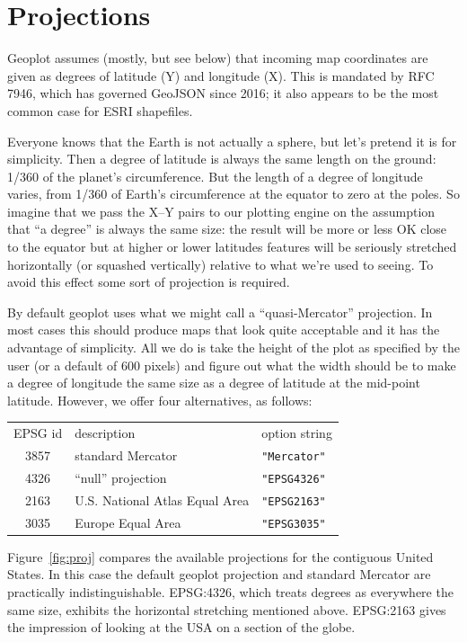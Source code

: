 \documentclass{article}
\newcommand{\myappendix}[1]{%
\addtocounter{appcount}{1}
\section{#1}}
\begin{document}
\clearpage
\myappendix{Projections}
\label{app:proj}

\textsf{Geoplot} assumes (mostly, but see below) that incoming map
coordinates are given as degrees of latitude (Y) and longitude
(X). This is mandated by RFC 7946, which has governed GeoJSON since
2016; it also appears to be the most common case for ESRI shapefiles.

Everyone knows that the Earth is not actually a sphere, but let's
pretend it is for simplicity. Then a degree of latitude is always the
same length on the ground: 1/360 of the planet's circumference. But
the length of a degree of longitude varies, from 1/360 of Earth's
circumference at the equator to zero at the poles. So imagine that we
pass the X--Y pairs to our plotting engine on the assumption that ``a
degree'' is always the same size: the result will be more or less OK
close to the equator but at higher or lower latitudes features will be
seriously stretched horizontally (or squashed vertically) relative to
what we're used to seeing. To avoid this effect some sort of
projection is required.

By default geoplot uses what we might call a ``quasi-Mercator''
projection. In most cases this should produce maps that look quite
acceptable and it has the advantage of simplicity. All we do is take
the height of the plot as specified by the user (or a default of 600
pixels) and figure out what the width should be to make a degree of
longitude the same size as a degree of latitude at the mid-point
latitude. However, we offer four alternatives, as follows:
\begin{center}
  \begin{tabular}{cll}
    EPSG id & description & option string \\[4pt]
  \textsf{3857} & standard Mercator & \verb|"Mercator"| \\
  \textsf{4326} & ``null'' projection & \verb|"EPSG4326"| \\
  \textsf{2163} & U.S. National Atlas Equal Area &
     \verb|"EPSG2163"| \\
  \textsf{3035} & Europe Equal Area & \verb|"EPSG3035"|
\end{tabular}
\end{center}

Figure~\ref{fig:proj} compares the available projections for the
contiguous United States. In this case the default \textsf{geoplot}
projection and standard Mercator are practically
indistinguishable. \textsf{EPSG:4326}, which treats degrees as
everywhere the same size, exhibits the horizontal stretching mentioned
above. \textsf{EPSG:2163} gives the impression of looking at the USA
on a section of the globe.
\end{document}
